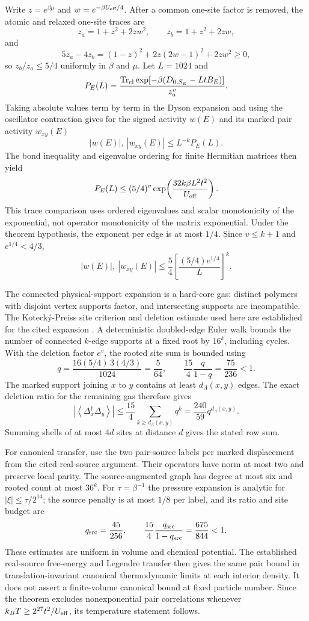 \documentclass[11pt]{article}
\DeclareMathOperator{\Tr}{Tr}
\newcommand{\Deltaop}{\Delta}
\begin{document}
Write $z=e^{\beta\mu}$ and $w=e^{-\beta U_{\rm eff}/4}$. After a common one-site factor is removed, the atomic and relaxed one-site traces are
\[
 z_a=1+z^2+2zw^2,\qquad z_b=1+z^2+2zw,
\]
and
\[
5z_a-4z_b=(1-z)^2+2z(2w-1)^2+2zw^2\ge0,
\]
so $z_b/z_a\le5/4$ uniformly in $\beta$ and $\mu$. Let $L=1024$ and
\[
 P_E(L)=\frac{\Tr_{\rm el}\exp[-\beta(D_{0,S_E}-LtB_E)]}{z_a^v}.
\]
Taking absolute values term by term in the Dyson expansion and using the oscillator contraction gives for the signed activity $w(E)$ and its marked pair activity $w_{xy}(E)$
\[
 |w(E)|,\ |w_{xy}(E)|\le L^{-k}P_E(L).
\]
The bond inequality and eigenvalue ordering for finite Hermitian matrices then yield
\[
 P_E(L)\le (5/4)^v\exp\!\left(\frac{32k\beta L^2t^2}{U_{\rm eff}}\right).
\]
This trace comparison uses ordered eigenvalues and scalar monotonicity of the exponential, not operator monotonicity of the matrix exponential. Under the theorem hypothesis, the exponent per edge is at most $1/4$. Since $v\le k+1$ and $e^{1/4}<4/3$,
\[
 |w(E)|,\ |w_{xy}(E)|\le \frac54\left[\frac{(5/4)e^{1/4}}{L}\right]^k.
\]

The connected physical-support expansion is a hard-core gas: distinct polymers with disjoint vertex supports factor, and intersecting supports are incompatible. The Koteck\'y-Preiss site criterion and deletion estimate used here are established for the cited expansion \cite{strongcoupling}. A deterministic doubled-edge Euler walk bounds the number of connected $k$-edge supports at a fixed root by $16^k$, including cycles. With the deletion factor $e^v$, the rooted site sum is bounded using
\[
 q=\frac{16(5/4)\,3(4/3)}{1024}=\frac5{64},\qquad
 \frac{15}{4}\frac{q}{1-q}=\frac{75}{236}<1.
\]
The marked support joining $x$ to $y$ contains at least $d_\Lambda(x,y)$ edges. The exact deletion ratio for the remaining gas therefore gives
\[
 \left|\left\langle\Deltaop_x^\dagger\Deltaop_y\right\rangle\right|
 \le\frac{15}{4}\sum_{k\ge d_\Lambda(x,y)}q^k
 =\frac{240}{59}q^{d_\Lambda(x,y)}.
\]
Summing shells of at most $4d$ sites at distance $d$ gives the stated row sum.

For canonical transfer, use the two pair-source labels per marked displacement from the cited real-source argument. Their operators have norm at most two and preserve local parity. The source-augmented graph has degree at most six and rooted count at most $36^k$. For $\tau=\beta^{-1}$ the pressure expansion is analytic for $|\xi|\le\tau/2^{14}$; the source penalty is at most $1/8$ per label, and its ratio and site budget are
\[
 q_{\rm src}=\frac{45}{256},\qquad
 \frac{15}{4}\frac{q_{\rm src}}{1-q_{\rm src}}=\frac{675}{844}<1.
\]
These estimates are uniform in volume and chemical potential. The established real-source free-energy and Legendre transfer then gives the same pair bound in translation-invariant canonical thermodynamic limits at each interior density. It does not assert a finite-volume canonical bound at fixed particle number. Since the theorem excludes nonexponential pair correlations whenever $k_BT\ge2^{27}t^2/U_{\rm eff}$, its temperature statement follows.
\end{document}
